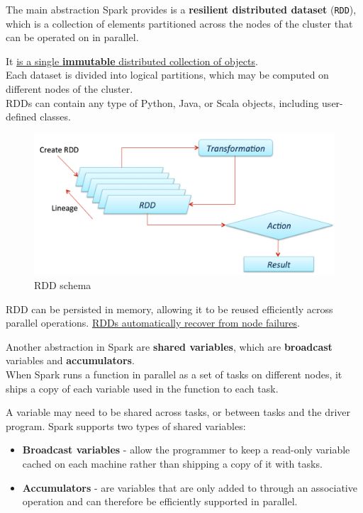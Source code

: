 \begin{paracol}{2}
   The main abstraction Spark provides is a \textbf{resilient distributed dataset} (\texttt{RDD}), which is a collection of elements partitioned across the nodes of the cluster that can be operated on in parallel.
   \begin{definition}
      [RDD]
      It \ul{is a single \textbf{immutable} distributed collection of objects}.\\
      Each dataset is divided into logical partitions, which may be computed on different nodes of the cluster.\\
      RDDs can contain any type of Python, Java, or Scala objects, including user-defined classes.
   \end{definition}
   
   \switchcolumn

   \begin{figure}[htbp]
      \centering
      \includegraphics[width=0.9\columnwidth]{images/14/spark_rdd.png}
      \caption{RDD schema}
      \label{fig:14/spark_rdd}
   \end{figure}

\end{paracol}


RDD can be persisted in memory, allowing it to be reused efficiently across parallel operations.
\ul{RDDs automatically recover from node failures}.
\nl

Another abstraction in Spark are \textbf{shared variables}, which are \textbf{broadcast} variables and \textbf{accumulators}.\\
When Spark runs a function in parallel as a set of tasks on different nodes, it ships a copy of each variable used in the function to each task.
{A variable may need to be shared across tasks, or between tasks and the driver program. Spark supports two types of shared variables:\ns
\begin{itemize}
   \item \textbf{Broadcast variables} - allow the programmer to keep a read-only variable cached on each machine rather than shipping a copy of it with tasks.
   \item \textbf{Accumulators} - are variables that are only added to through an associative operation and can therefore be efficiently supported in parallel.
\end{itemize}}

